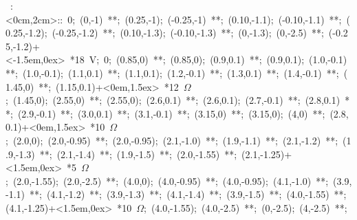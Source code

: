 \hbox{
\xy    <2cm,0cm>:<0cm,2cm>::
       0; (0,-1) **\dir{-};
	   (0.25,-1); (-0.25,-1) **\dir{-};
	   (0.10,-1.1); (-0.10,-1.1) **\dir{-};
	   (0.25,-1.2); (-0.25,-1.2) **\dir{-};
	   (0.10,-1.3); (-0.10,-1.3) **\dir{-};
	   (0,-1.3); (0,-2.5) **\dir{-};  
	   (-0.25,-1.2)+<-1.5em,0ex> *{\hbox{18 V}};            %
	   0; (0.85,0)  **\dir{-};
	   (0.85,0); (0.9,0.1) **\dir{-}; 
	   (0.9,0.1); (1.0,-0.1) **\dir{-};
	   (1.0,-0.1); (1.1,0.1) **\dir{-};
	   (1.1,0.1); (1.2,-0.1) **\dir{-};
	   (1.3,0.1) **\dir{-}; 
	   (1.4,-0.1) **\dir{-}; 
	   (1.45,0) **\dir{-};
	   (1.15,0.1)+<0em,1.5ex> *{\hbox{12 $\Omega$}};        %
	   (1.45,0); (2.55,0) **\dir{-};
	   (2.55,0); (2.6,0.1) **\dir{-}; 
	   (2.6,0.1); (2.7,-0.1) **\dir{-};
	   (2.8,0.1) **\dir{-}; 
	   (2.9,-0.1) **\dir{-}; 
	   (3.0,0.1) **\dir{-};
	   (3.1,-0.1) **\dir{-};
	   (3.15,0) **\dir{-};
	   (3.15,0); (4,0) **\dir{-};
	   (2.8,0.1)+<0em,1.5ex> *{\hbox{10 $\Omega$}};        %
	   (2.0,0); (2.0,-0.95) **\dir{-};
	   (2.0,-0.95);  (2.1,-1.0) **\dir{-};
	   (1.9,-1.1) **\dir{-};
	   (2.1,-1.2) **\dir{-};
	   (1.9,-1.3) **\dir{-};
	   (2.1,-1.4) **\dir{-};
	   (1.9,-1.5) **\dir{-};
	   (2.0,-1.55) **\dir{-};
	   (2.1,-1.25)+<1.5em,0ex> *{\hbox{5 $\Omega$}};       %
	   (2.0,-1.55); (2.0,-2.5) **\dir{-};
	   (4.0,0); (4.0,-0.95) **\dir{-};
	   (4.0,-0.95);  (4.1,-1.0) **\dir{-};
	   (3.9,-1.1) **\dir{-};
	   (4.1,-1.2) **\dir{-};
	   (3.9,-1.3) **\dir{-};
	   (4.1,-1.4) **\dir{-};
	   (3.9,-1.5) **\dir{-};
	   (4.0,-1.55) **\dir{-};
	   (4.1,-1.25)+<1.5em,0ex> *{\hbox{10 $\Omega$}};       %
	   (4.0,-1.55); (4.0,-2.5) **\dir{-};
	   (0,-2.5); (4,-2.5) **\dir{-};
	   \endxy}
